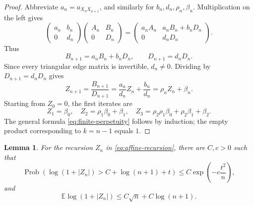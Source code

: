 \documentclass[11pt,a4paper]{amsart}
\newtheorem{lemma}[theorem]{Lemma}
\theoremstyle{definition}
\theoremstyle{remark}
\numberwithin{equation}{section}
\newcommand{\EE}{\mathbb E}
\newcommand{\Prob}{\operatorname{Prob}}
\newcommand{\1}{\boldsymbol 1}
\begin{document}
\begin{proof}
Abbreviate
$a_n=a_{X_nX_{n+1}}$, and similarly for $b_n,d_n,\rho_n,\beta_n$.
Multiplication on the left gives
$$
 \begin{pmatrix}a_n&b_n\\0&d_n\end{pmatrix}
 \begin{pmatrix}A_n&B_n\\0&D_n\end{pmatrix}
 =\begin{pmatrix}
   a_nA_n&a_nB_n+b_nD_n\\0&d_nD_n
  \end{pmatrix}.
$$
Thus
$$
 B_{n+1}=a_nB_n+b_nD_n,
 \qquad D_{n+1}=d_nD_n.
$$
Since every triangular edge matrix is invertible, $d_n\ne0$.
Dividing by $D_{n+1}=d_nD_n$ gives
$$
 Z_{n+1}=\frac{B_{n+1}}{D_{n+1}}
 =\frac{a_n}{d_n}Z_n+\frac{b_n}{d_n}
 =\rho_nZ_n+\beta_n.
$$
Starting from $Z_0=0$, the first iterates are
$$
 Z_1=\beta_0,
 \quad
 Z_2=\rho_1\beta_0+\beta_1,
 \quad
 Z_3=\rho_2\rho_1\beta_0+\rho_2\beta_1+\beta_2.
$$
The general formula \eqref{eq:finite-perpetuity} follows by induction;
the empty product corresponding to $k=n-1$ equals $1$.
\end{proof}

\begin{lemma}%
\label{lem:critical-perpetuity}
For the recursion $Z_n$ in \eqref{eq:affine-recursion}, there are $C,c>0$ such
that
\begin{equation}\label{eq:perpetuity-tail-article}
 \Prob\left(
  \log(1+|Z_n|)>C+\log(n+1)+t
 \right)
 \le C\exp\left(-c\frac{t^2}{n}\right),
\end{equation}
and
\begin{equation}\label{eq:perpetuity-mean-article}
 \EE\log(1+|Z_n|)\le C\sqrt n+C\log(n+1).
\end{equation}
\end{lemma}
\end{document}
